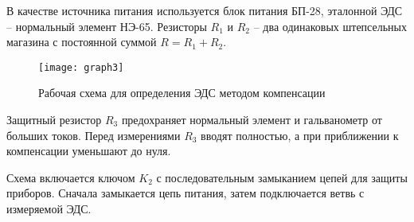 В качестве источника питания используется блок питания БП-28, эталонной ЭДС -- нормальный элемент НЭ-65. Резисторы $R_1$ и $R_2$ -- два одинаковых штепсельных магазина с постоянной суммой $R = R_1 + R_2$.

\begin{figure}[H]
	\centering
	\texttt{[image: graph3]}
	\caption{Рабочая схема для определения ЭДС методом компенсации}
	\label{fig:3}
\end{figure}

Защитный резистор $R_3$ предохраняет нормальный элемент и гальванометр от больших токов. Перед измерениями $R_3$ вводят полностью, а при приближении к компенсации уменьшают до нуля.

Схема включается ключом $K_2$ с последовательным замыканием цепей для защиты приборов. Сначала замыкается цепь питания, затем подключается ветвь с измеряемой ЭДС.